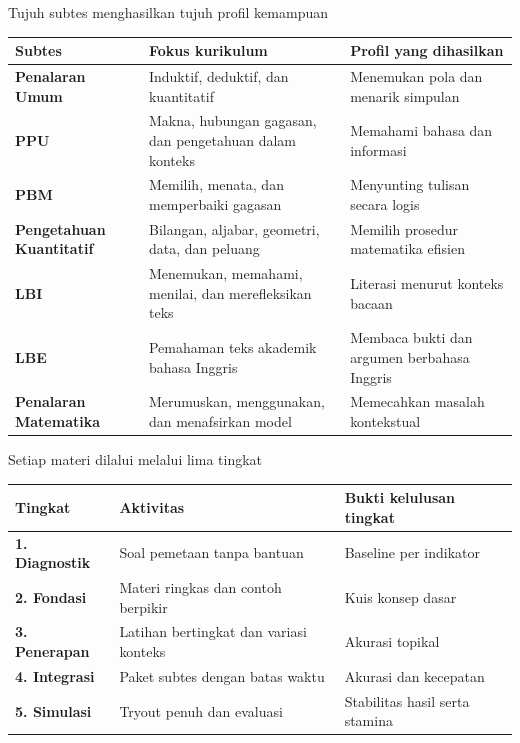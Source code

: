 \begin{frame}[shrink=7]{Tujuh subtes menghasilkan tujuh profil kemampuan}
  {\fontsize{9.3}{11.5}\selectfont
  \renewcommand{\arraystretch}{0.94}
  \begin{tabularx}{\textwidth}{>{\bfseries\color{StudentBlue}}p{} >{\RaggedRight\arraybackslash}X >{\RaggedRight\arraybackslash}p{}}
    \toprule
    \textbf{Subtes} & \textbf{Fokus kurikulum} & \textbf{Profil yang dihasilkan} \\
    \midrule
    Penalaran Umum & Induktif, deduktif, dan kuantitatif & Menemukan pola dan menarik simpulan \\
    PPU & Makna, hubungan gagasan, dan pengetahuan dalam konteks & Memahami bahasa dan informasi \\
    PBM & Memilih, menata, dan memperbaiki gagasan & Menyunting tulisan secara logis \\
    Pengetahuan Kuantitatif & Bilangan, aljabar, geometri, data, dan peluang & Memilih prosedur matematika efisien \\
    LBI & Menemukan, memahami, menilai, dan merefleksikan teks & Literasi menurut konteks bacaan \\
    LBE & Pemahaman teks akademik bahasa Inggris & Membaca bukti dan argumen berbahasa Inggris \\
    Penalaran Matematika & Merumuskan, menggunakan, dan menafsirkan model & Memecahkan masalah kontekstual \\
    \bottomrule
  \end{tabularx}}
\end{frame}

\begin{frame}{Setiap materi dilalui melalui lima tingkat}
  {\fontsize{10.0}{12.5}\selectfont
  \renewcommand{\arraystretch}{0.98}
  \begin{tabularx}{\textwidth}{>{\bfseries\color{StudentBlue}}p{} >{\RaggedRight\arraybackslash}X >{\RaggedRight\arraybackslash}p{}}
    \toprule
    \textbf{Tingkat} & \textbf{Aktivitas} & \textbf{Bukti kelulusan tingkat} \\
    \midrule
    1. Diagnostik & Soal pemetaan tanpa bantuan & Baseline per indikator \\
    2. Fondasi & Materi ringkas dan contoh berpikir & Kuis konsep dasar \\
    3. Penerapan & Latihan bertingkat dan variasi konteks & Akurasi topikal \\
    4. Integrasi & Paket subtes dengan batas waktu & Akurasi dan kecepatan \\
    5. Simulasi & Tryout penuh dan evaluasi & Stabilitas hasil serta stamina \\
    \bottomrule
  \end{tabularx}}
  \vspace{0.14cm}
\end{frame}

